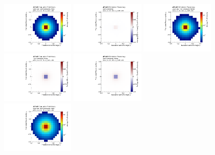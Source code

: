 \begin{figure}[htpb]
\begin{center}
  \includegraphics[width=0.31\textwidth]{figures/CNN/quark_truth_pythia.pdf}
  \includegraphics[width=0.31\textwidth]{figures/CNN/diff_truthq_pythiaherwig.pdf}
  \includegraphics[width=0.31\textwidth]{figures/CNN/quark_truth_herwig.pdf}\\
  \includegraphics[width=0.31\textwidth]{figures/CNN/diff_truth_pythia.pdf}\hspace{54mm}
  \includegraphics[width=0.31\textwidth]{figures/CNN/diff_truth_herwig.pdf}\\
  \includegraphics[width=0.31\textwidth]{figures/CNN/gluon_truth_pythia.pdf}

\end{center}
\end{figure}
